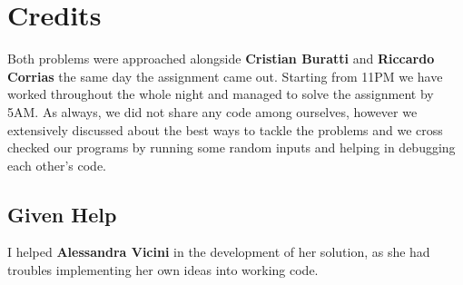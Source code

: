 \documentclass{article}
\begin{document}
\section*{Credits}
Both problems were approached alongside \textbf{Cristian Buratti} and \textbf{Riccardo Corrias} the same day the assignment came out. Starting from 11PM we have worked throughout the whole night and managed to solve the assignment by 5AM. As always, we did not share any code among ourselves, however we extensively discussed about the best ways to tackle the problems and we cross checked our programs by running some random inputs and helping in debugging each other's code.
\subsection{Given Help}
I helped \textbf{Alessandra Vicini} in the development of her solution, as she had troubles implementing her own ideas into working code.
\end{document}
